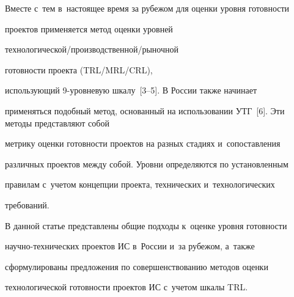   Вместе с~тем в~настоящее время за рубежом для оценки уровня готовности 

проектов применяется метод оценки уровней  

тех\-но\-ло\-ги\-че\-ской\!/\!про\-из\-вод\-ст\-вен\-ной\!/\!ры\-ноч\-ной 

готовности проекта (TRL\!/\!MRL\!/\!CRL), 

использующий \mbox{9-уров}\-не\-вую шкалу~[3--5]. В России также начинает 

применяться подобный метод, основанный на использовании УТГ~[6]. Эти методы представляют собой 

метрику оценки готовности проектов на разных стадиях и~сопоставления 

различных проектов между собой. Уровни определяются по установленным 

правилам с~учетом концепции проекта, технических и~технологических 

требований. 

  

  В данной статье представлены общие подходы к~оценке уровня готовности  

на\-уч\-но-тех\-ни\-че\-ских проектов ИС в~России и~за рубежом, а~также 

сформулированы предложения по совершенствованию методов оценки 

технологической готовности проектов ИС с~учетом шкалы TRL.



